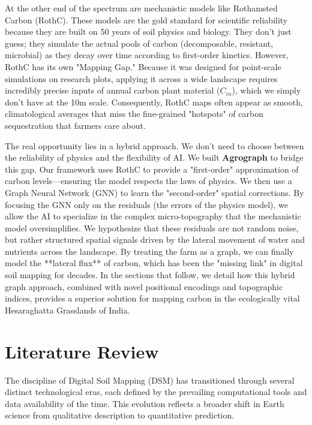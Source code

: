 \documentclass[conference]{IEEEtran}
\begin{document}
At the other end of the spectrum are mechanistic models like Rothamsted Carbon (RothC). These models are the gold standard for scientific reliability because they are built on 50 years of soil physics and biology. They don't just guess; they simulate the actual pools of carbon (decomposable, resistant, microbial) as they decay over time according to first-order kinetics. However, RothC has its own "Mapping Gap." Because it was designed for point-scale simulations on research plots, applying it across a wide landscape requires incredibly precise inputs of annual carbon plant material ($C_{in}$), which we simply don't have at the 10m scale. Consequently, RothC maps often appear as smooth, climatological averages that miss the fine-grained "hotspots" of carbon sequestration that farmers care about.

The real opportunity lies in a hybrid approach. We don't need to choose between the reliability of physics and the flexibility of AI. We built \textbf{Agrograph} to bridge this gap. Our framework uses RothC to provide a "first-order" approximation of carbon levels—ensuring the model respects the laws of physics. We then use a Graph Neural Network (GNN) to learn the "second-order" spatial corrections. By focusing the GNN only on the residuals (the errors of the physics model), we allow the AI to specialize in the complex micro-topography that the mechanistic model oversimplifies. We hypothesize that these residuals are not random noise, but rather structured spatial signals driven by the lateral movement of water and nutrients across the landscape. By treating the farm as a graph, we can finally model the **lateral flux** of carbon, which has been the "missing link" in digital soil mapping for decades. In the sections that follow, we detail how this hybrid graph approach, combined with novel positional encodings and topographic indices, provides a superior solution for mapping carbon in the ecologically vital Hesaraghatta Grasslands of India.

\section{Literature Review}

The discipline of Digital Soil Mapping (DSM) has transitioned through several distinct technological eras, each defined by the prevailing computational tools and data availability of the time. This evolution reflects a broader shift in Earth science from qualitative description to quantitative prediction.
\end{document}
